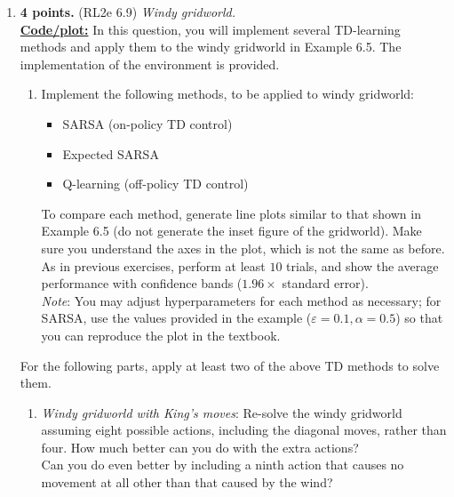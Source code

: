 \documentclass{article}
\newcommand{\solnewpage}{\newpage}
\newcommand{\solnewpage}{}
\begin{document}
\begin{enumerate}
\begin{enumerate}
	      \end{enumerate}

	      \solnewpage

	\item \textbf{4 points.} (RL2e 6.9) \textit{Windy gridworld.} \\
	    
	      \uline{\textbf{Code/plot:}}
	      In this question, you will implement several TD-learning methods and apply them to the windy gridworld in Example 6.5. The implementation of the environment is provided. 
	      \begin{enumerate}
		      \item Implement the following methods, to be applied to windy gridworld:
		            \begin{itemize}
			            \item SARSA (on-policy TD control)
			            \item Expected SARSA
			            \item Q-learning (off-policy TD control)
		            \end{itemize}
		            To compare each method, generate line plots similar to that shown in Example 6.5 (do not generate the inset figure of the gridworld). Make sure you understand the axes in the plot, which is not the same as before. \\
		            As in previous exercises, perform at least $10$ trials, and show the average performance with confidence bands ($1.96 \times$ standard error). \\
		            \textit{Note}: You may adjust hyperparameters for each method as necessary; for SARSA, use the values provided in the example ($\varepsilon = 0.1, \alpha = 0.5$) so that you can reproduce the plot in the textbook.

	      \end{enumerate}
	      For the following parts, apply at least two of the above TD methods to solve them.
	      \begin{enumerate}[resume]
		      \item \textit{Windy gridworld with King's moves}: Re-solve the windy gridworld assuming eight possible actions, including the diagonal moves, rather than four. How much better can you do with the extra actions? \\
		            Can you do even better by including a ninth action that causes no movement at all other than that caused by the wind?

	      \end{enumerate}


\end{enumerate}
\end{document}
